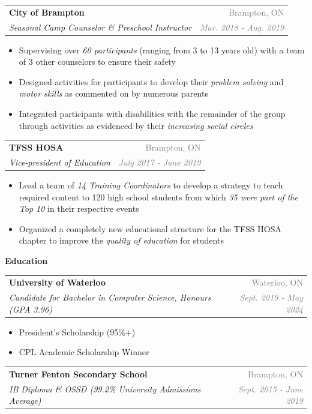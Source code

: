 \documentclass[letterpaper,11pt]{article}
\makeatletter
\newcommand{\resheading}[1]{{\large \colorbox{LightMidnightBlue}{\begin{minipage}{\textwidth}{\textbf{\textrm{#1 \vphantom{p\^{E}}}}}\end{minipage}}}}
\newcommand{\ressubheading}[4]{
\begin{tabular*}{7in}{l@{\extracolsep{\fill}}r}
        \textbf{#1} & \textcolor{gray}{#2} \\
        \textit{#3} & \textcolor{gray}{\textit{#4}} \\
\end{tabular*}\vspace{-6pt}}
\makeatother
\begin{document}
    \ressubheading{City of Brampton}{Brampton, ON}{Seasonal Camp Counselor \& Preschool Instructor}{Mar. 2018 - Aug. 2019}
        \begin{itemize}
            \item Supervising over \textit{60 participants} (ranging from 3 to 13 years old) with a team of 3 other counselors to ensure their safety
            \item Designed activities for participants to develop their \textit{problem solving} and \textit{motor skills} as commented on by numerous parents
            \item Integrated participants with disabilities with the remainder of the group through activities as evidenced by their \textit{increasing social circles}
        \end{itemize}
    
    \ressubheading{TFSS HOSA}{Brampton, ON}{Vice-president of Education}{July 2017 - June 2019}
    \begin{itemize}
        \item Lead a team of \textit{14 Training Coordinators} to develop a strategy to teach required content to 120 high school students from which \textit{35 were part of the Top 10} in their respective events
        \item Organized a completely new educational structure for the TFSS HOSA chapter to improve the \textit{quality of education} for students
    \end{itemize}

\resheading{Education}

\vspace{2mm}

\ressubheading{University of Waterloo}{Waterloo, ON}{Candidate for Bachelor in Computer Science, Honours (GPA 3.96)}{Sept. 2019 - May 2024}

\begin{itemize}
    \item President's Scholarship (95\%+)
    \item CPL Academic Scholarship Winner
\end{itemize}

\ressubheading{Turner Fenton Secondary School}{Brampton, ON}{IB Diploma \& OSSD (99.2\% University Admissions Average)}{Sept. 2015 - June 2019}
\end{document}
